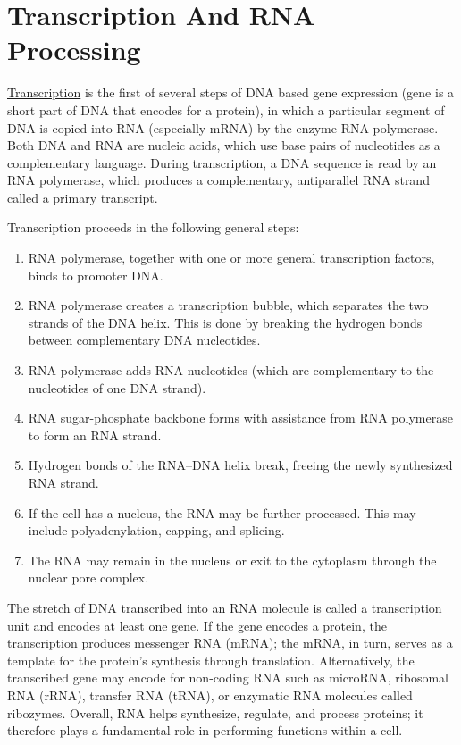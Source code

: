 \chapter{Transcription And RNA Processing}\label{transcription-and-rna-processing}

\href{https://en.wikipedia.org/wiki/Transcription_(biology)}{Transcription} is the first of several steps of DNA based gene expression (gene is a short part of DNA that encodes for a protein), in which a particular segment of DNA is copied into RNA (especially mRNA) by the enzyme RNA polymerase. Both DNA and RNA are nucleic acids, which use base pairs of nucleotides as a complementary language. During transcription, a DNA sequence is read by an RNA polymerase, which produces a complementary, antiparallel RNA strand called a primary transcript.

Transcription proceeds in the following general steps:

\begin{enumerate}
\def\labelenumi{\arabic{enumi}.}
\tightlist
\item
  RNA polymerase, together with one or more general transcription factors, binds to promoter DNA.
\item
  RNA polymerase creates a transcription bubble, which separates the two strands of the DNA helix. This is done by breaking the hydrogen bonds between complementary DNA nucleotides.
\item
  RNA polymerase adds RNA nucleotides (which are complementary to the nucleotides of one DNA strand).
\item
  RNA sugar-phosphate backbone forms with assistance from RNA polymerase to form an RNA strand.
\item
  Hydrogen bonds of the RNA--DNA helix break, freeing the newly synthesized RNA strand.
\item
  If the cell has a nucleus, the RNA may be further processed. This may include polyadenylation, capping, and splicing.
\item
  The RNA may remain in the nucleus or exit to the cytoplasm through the nuclear pore complex.
\end{enumerate}

The stretch of DNA transcribed into an RNA molecule is called a transcription unit and encodes at least one gene. If the gene encodes a protein, the transcription produces messenger RNA (mRNA); the mRNA, in turn, serves as a template for the protein's synthesis through translation. Alternatively, the transcribed gene may encode for non-coding RNA such as microRNA, ribosomal RNA (rRNA), transfer RNA (tRNA), or enzymatic RNA molecules called ribozymes. Overall, RNA helps synthesize, regulate, and process proteins; it therefore plays a fundamental role in performing functions within a cell.

